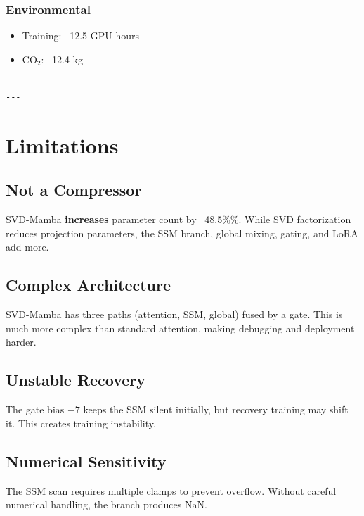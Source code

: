 \subsubsection{Environmental}
\begin{itemize}
\item Training: ~12.5 GPU-hours
\item CO$_2$: ~12.4 kg
\end{itemize}
\begin{lstlisting}

---
\end{lstlisting}


\section{Limitations}

\subsection{Not a Compressor}

SVD-Mamba \textbf{increases} parameter count by ~48.5\%\%. While SVD 
factorization reduces projection parameters, the SSM branch, global 
mixing, gating, and LoRA add more.

\subsection{Complex Architecture}

SVD-Mamba has three paths (attention, SSM, global) fused by a gate. This 
is much more complex than standard attention, making debugging and 
deployment harder.

\subsection{Unstable Recovery}

The gate bias $-7$ keeps the SSM silent initially, but recovery training 
may shift it. This creates training instability.

\subsection{Numerical Sensitivity}

The SSM scan requires multiple clamps to prevent overflow. Without careful 
numerical handling, the branch produces NaN.

